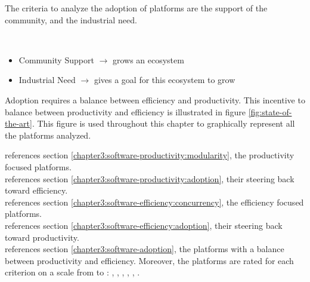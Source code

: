 \separator

The criteria to analyze the adoption of platforms are the support of the community, and the industrial need.

\atomic {
  \begin{itemize}
  \item Community Support
    \subitem $\to$ grows an ecosystem
  \item Industrial Need
    \subitem $\to$ gives a goal for this ecosystem to grow
  \end{itemize}
}

\separator

Adoption requires a balance between efficiency and productivity.
This incentive to balance between productivity and efficiency is illustrated in figure \ref{fig:state-of-the-art}.
This figure is used throughout this chapter to graphically represent all the platforms analyzed.

\noindent
{} references section \ref{chapter3:software-productivity:modularity}, the productivity focused platforms.\\
 references section \ref{chapter3:software-productivity:adoption}, their steering back toward efficiency.\\
 references section \ref{chapter3:software-efficiency:concurrency}, the efficiency focused platforms.\\
 references section \ref{chapter3:software-efficiency:adoption}, their steering back toward productivity.\\
 references section \ref{chapter3:software-adoption}, the platforms with a balance between productivity and efficiency.
Moreover, the platforms are rated for each criterion on a scale from  to : , , , , , .

\begin{figure}[h!]
%
\end{figure}